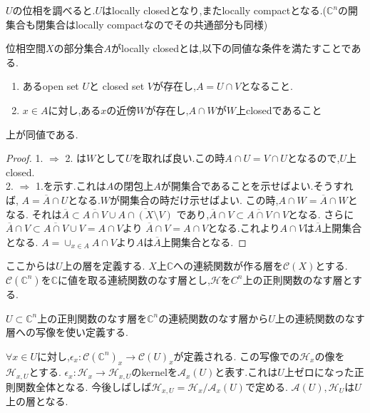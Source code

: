 $U$の位相を調べると.$U$はlocally closedとなり,またlocally compactとなる.($\mathbb{C}^n$の開集合も閉集合はlocally compactなのでその共通部分も同様)
\begin{screen}
\begin{dfn}
位相空間$X$の部分集合$A$がlocally closedとは,以下の同値な条件を満たすことである.
\begin{enumerate}
  \item あるopen set $U$と closed set $V$が存在し,$A = U \cap V$となること.
  \item $x \in A$に対し,ある$x$の近傍$W$が存在し,$A \cap W$が$W$上closedであること
\end{enumerate}
\end{dfn}
\end{screen}
\begin{lem}
上が同値である.
\end{lem}
\begin{proof}
1. $\Rightarrow$ 2. は$W$として$U$を取れば良い.この時$A \cap U = V \cap U$となるので,$U$上closed. \\
2. $\Rightarrow$ 1.を示す.これは$A$の閉包上$A$が開集合であることを示せばよい.そうすれば,
$A = \overline{A} \cap U$となる.$W$が開集合の時だけ示せばよい.
この時,$A \cap W =  \overline{A} \cap W$となる.
それは$\overline{A} \subset \overline{A \cap V} \cup \overline{A \cap (X \setminus V)}$
であり,$\overline{A} \cap V \subset \overline{A \cap V} \cap V$となる.
さらに$\overline{A} \cap V \subset \overline{A \cap V} \cup V = A \cap V$より
$\overline{A} \cap V = A \cap V$となる.これより$A \cap V$は$\overline{A}$上開集合となる.
$A = \cup_{x \in A} A \cap V$より$A$は$\overline{A}$上開集合となる.
\end{proof}

ここからは$U$上の層を定義する.
$X$上$\mathbb{C}$への連続関数が作る層を$\mathcal{C}(X)$とする.
$\mathcal{C}(\mathbb{C}^n)$を$\mathbb{C}$に値を取る連続関数のなす層とし,$\mathcal{H}$を$C^n$上の正則関数のなす層とする.


$U \subset \mathbb{C}^n$上の正則関数のなす層を$\mathbb{C}^n$の連続関数のなす層から$U$上の連続関数のなす層への写像を使い定義する.

$\forall x \in U$に対し,$\epsilon_x:\mathcal{C}(\mathbb{C}^n)_x \to \mathcal{C}(U)_x$が定義される.
この写像での$\mathcal{H}_x$の像を$\mathcal{H}_{x,U}$とする.
$\epsilon_x: \mathcal{H}_x \to \mathcal{H}_{x, U}$のkernelを$\mathcal{A}_x(U)$と表す.これは$U$上ゼロになった正則関数全体となる.
今後しばしば$\mathcal{H}_{x, U}= \mathcal{H}_{x}/ \mathcal{A}_x(U)$で定める.
$\mathcal{A}(U), \mathcal{H}_{U}$は$U$上の層となる.

